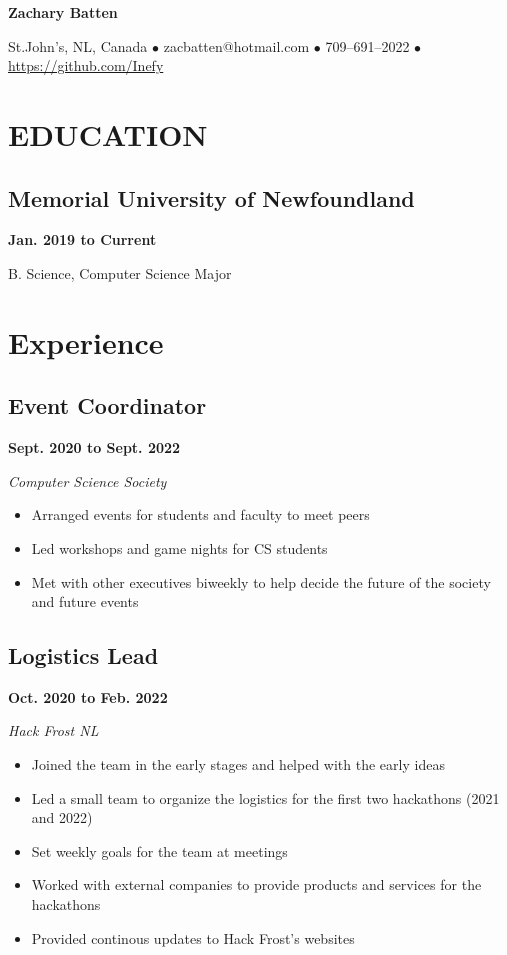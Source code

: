 \documentclass[12pt]{extarticle}
\begin{document}
\begin{center}
\textbf{\huge{Zachary Batten}}

St.John's, NL, Canada
$\bullet$ zacbatten@hotmail.com
$\bullet$ 709--691--2022
$\bullet$ \href{https://github.com/Inefy}{https://github.com/Inefy}
\end{center}

\section*{EDUCATION}
\subsection*{Memorial University of Newfoundland} \hfill \textbf{Jan. 2019 to Current}

B. Science, Computer Science Major

\section*{Experience}
\subsection*{Event Coordinator} \hfill \textbf{Sept. 2020 to Sept. 2022}

\textit{Computer Science Society}
\begin{itemize}
  \item Arranged events for students and faculty to meet peers
  \item Led workshops and game nights for CS students
  \item Met with other executives biweekly to help decide the future of the society and future events
\end{itemize}

\subsection*{Logistics Lead} \hfill \textbf{Oct. 2020 to Feb. 2022}

\textsl{Hack Frost NL}
\begin{itemize}
  \item Joined the team in the early stages and helped with the early ideas
  \item Led a small team to organize the logistics for the first two hackathons (2021 and 2022)
  \item Set weekly goals for the team at meetings
  \item Worked with external companies to provide products and services for the hackathons
  \item Provided continous updates to Hack Frost's websites
\end{itemize}
\end{document}
